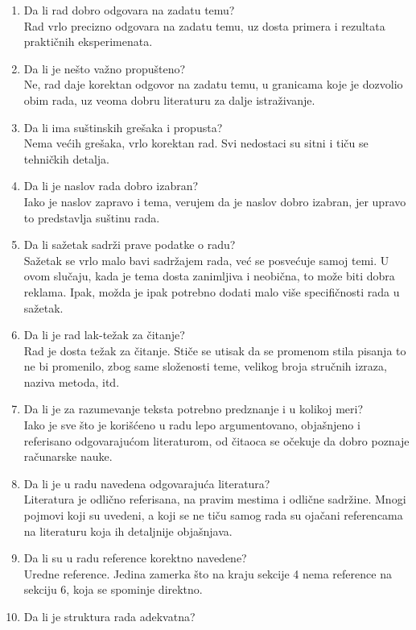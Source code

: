 \documentclass[a4paper]{report}
\begin{document}
\begin{enumerate}
\item Da li rad dobro odgovara na zadatu temu?\\
{Rad vrlo precizno odgovara na zadatu temu, uz dosta primera i rezultata praktičnih eksperimenata.}
\item Da li je nešto važno propušteno?\\
{Ne, rad daje korektan odgovor na zadatu temu, u granicama koje je dozvolio obim rada, uz veoma dobru literaturu za dalje istraživanje.}
\item Da li ima suštinskih grešaka i propusta?\\
{Nema većih grešaka, vrlo korektan rad. Svi nedostaci su sitni i tiču se tehničkih detalja.}
\item Da li je naslov rada dobro izabran?\\
{Iako je naslov zapravo i tema, verujem da je naslov dobro izabran, jer upravo to predstavlja suštinu rada.}
\item Da li sažetak sadrži prave podatke o radu?\\
{Sažetak se vrlo malo bavi sadržajem rada, već se posvećuje samoj temi. U ovom slučaju, kada je tema dosta zanimljiva i neobična, to može biti dobra reklama. Ipak, možda je ipak potrebno dodati malo više specifičnosti rada u sažetak.}
\item Da li je rad lak-težak za čitanje?\\
{Rad je dosta težak za čitanje. Stiče se utisak da se promenom stila pisanja to ne bi promenilo, zbog same složenosti teme, velikog broja stručnih izraza, naziva metoda, itd.}
\item Da li je za razumevanje teksta potrebno predznanje i u kolikoj meri?\\
{Iako je sve što je korišćeno u radu lepo argumentovano, objašnjeno i referisano odgovarajućom literaturom, od čitaoca se očekuje da dobro poznaje računarske nauke.}
\item Da li je u radu navedena odgovarajuća literatura?\\
{Literatura je odlično referisana, na pravim mestima i odlične sadržine. Mnogi pojmovi koji su uvedeni, a koji se ne tiču samog rada su ojačani referencama na literaturu koja ih detaljnije objašnjava.}
\item Da li su u radu reference korektno navedene?\\
{Uredne reference. Jedina zamerka što na kraju sekcije 4 nema reference na sekciju 6, koja se spominje direktno.}
\item Da li je struktura rada adekvatna?\\

\end{enumerate}
\end{document}
